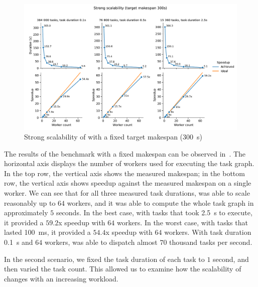 \begin{figure}[h]
	\centering
	\includegraphics[width=\textwidth]{imgs/hq/charts/scalability-fixed-makespan}
	\caption{Strong scalability of \hyperqueue{} with a fixed target makespan
	(\SI{300}{\second})}
	\label{fig:hq-scalability-fixed-makespan}
\end{figure}

The results of the benchmark with a fixed makespan can be observed in~. The
horizontal axis displays the number of workers used for executing the task graph. In the top row,
the vertical axis shows the measured makespan; in the bottom row, the vertical axis shows speedup
against the measured makespan on a single worker. We can see that for all three measured task
durations, \hyperqueue{} was able to scale reasonably up to $64$
workers, and it was able to compute the whole task graph in approximately $5$
seconds. In the best case, with tasks that took \SI{2.5}{\second} to execute, it provided a
$59.2$x speedup with $64$ workers. In the worst case, with tasks
that lasted \SI{100}{\milli\second}, it provided a $54.4$x speedup with
$64$ workers. With task duration \SI{0.1}{\second} and
$64$ workers, \hyperqueue{} was able to dispatch almost
$70$ thousand tasks per second.

In the second scenario, we fixed the task duration of each task to $1$ second,
and then varied the task count. This allowed us to examine how the scalability of
\hyperqueue{} changes with an increasing workload.

